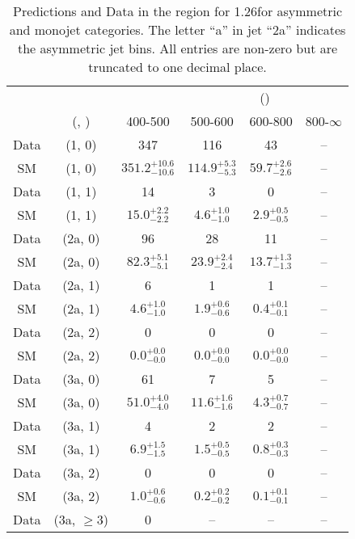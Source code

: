 \begin{table}[h!]
\tiny
\centering
\caption{Predictions and Data in the \gj region for 1.26\ifb for asymmetric and monojet categories. The letter ``a'' in jet \eg ``2a''  indicates the asymmetric jet bins. All entries are non-zero but are truncated to one decimal place.\label{tab:yieldsallpost_gj_comb_asym}}
\begin{tabular}
{cccccc}
	\hline\hline
&	&	& \multicolumn{4}{c}{\scalht (\gev)}\\ 
	&	 (\njet, \nb) & 400-500 & 500-600 & 600-800 & 800-$\infty$ \\ [0.8ex] 
\hline
	Data & (1, 0) & 347 & 116 & 43 & -- \\[0.5ex] 
	SM & (1, 0) & $351.2^{+ 10.6 }_{- 10.6 }$ & $114.9^{+ 5.3 }_{- 5.3 }$ & $59.7^{+ 2.6 }_{- 2.6 }$ & -- \\[0.5ex] 
	Data & (1, 1) & 14 & 3 & 0 & -- \\[0.5ex] 
	SM & (1, 1) & $15.0^{+ 2.2 }_{- 2.2 }$ & $4.6^{+ 1.0 }_{- 1.0 }$ & $2.9^{+ 0.5 }_{- 0.5 }$ & -- \\[0.5ex] 
	Data & (2a, 0) & 96 & 28 & 11 & -- \\[0.5ex] 
	SM & (2a, 0) & $82.3^{+ 5.1 }_{- 5.1 }$ & $23.9^{+ 2.4 }_{- 2.4 }$ & $13.7^{+ 1.3 }_{- 1.3 }$ & -- \\[0.5ex] 
	Data & (2a, 1) & 6 & 1 & 1 & -- \\[0.5ex] 
	SM & (2a, 1) & $4.6^{+ 1.0 }_{- 1.0 }$ & $1.9^{+ 0.6 }_{- 0.6 }$ & $0.4^{+ 0.1 }_{- 0.1 }$ & -- \\[0.5ex] 
	Data & (2a, 2) & 0 & 0 & 0 & -- \\[0.5ex] 
	SM & (2a, 2) & $0.0^{+ 0.0 }_{- 0.0 }$ & $0.0^{+ 0.0 }_{- 0.0 }$ & $0.0^{+ 0.0 }_{- 0.0 }$ & -- \\[0.5ex] 
	Data & (3a, 0) & 61 & 7 & 5 & -- \\[0.5ex] 
	SM & (3a, 0) & $51.0^{+ 4.0 }_{- 4.0 }$ & $11.6^{+ 1.6 }_{- 1.6 }$ & $4.3^{+ 0.7 }_{- 0.7 }$ & -- \\[0.5ex] 
	Data & (3a, 1) & 4 & 2 & 2 & -- \\[0.5ex] 
	SM & (3a, 1) & $6.9^{+ 1.5 }_{- 1.5 }$ & $1.5^{+ 0.5 }_{- 0.5 }$ & $0.8^{+ 0.3 }_{- 0.3 }$ & -- \\[0.5ex] 
	Data & (3a, 2) & 0 & 0 & 0 & -- \\[0.5ex] 
	SM & (3a, 2) & $1.0^{+ 0.6 }_{- 0.6 }$ & $0.2^{+ 0.2 }_{- 0.2 }$ & $0.1^{+ 0.1 }_{- 0.1 }$ & -- \\[0.5ex] 
	Data & (3a, $\ge3$) & 0 & -- & -- & -- \\[0.5ex] 

\end{tabular}
\end{table}
